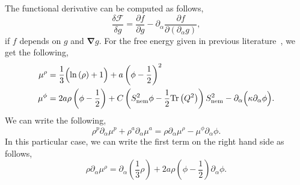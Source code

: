 \documentclass[fleqn,a4paper]{article} %
\numberwithin{equation}{section} %
\numberwithin{figure}{section} %
\numberwithin{algorithm}{section} %
\begin{document}
The functional derivative can be computed as follows,
\begin{equation}
    \frac{\delta \mathcal{F}}{\delta g} = \frac{\partial f}{\partial g} - \partial_\alpha \frac{\partial f}{\partial\left(\partial_\alpha g\right)},
\end{equation}
if $f$ depends on $g$ and $\bm{\nabla}g$. For the free energy given in previous literature~\cite{bhattacharyya_phase_2023}, we get the following,
\begin{equation}
\begin{split}
    \mu^\rho &= \frac{1}{3}\Bigl(\ln \left(\rho\right) + 1\Bigr) + a \left(\phi - \frac12\right)^2\\
    \mu^\phi &= 2 a \rho \left(\phi - \frac12\right) + C\left(S_\text{nem}^2 \phi - \frac12 \text{Tr}\left(Q^2\right)\right)S_\text{nem}^2 - \partial_\alpha\Bigl(\kappa \partial_\alpha \phi\Bigr).
\end{split}
\end{equation}
We can write the following,
\begin{equation}
    \rho^p\partial_\alpha \mu^p + \rho^a\partial_\alpha \mu^a = \rho \partial_\alpha \mu^\rho - \mu^\phi \partial_\alpha \phi.
\end{equation}
In this particular case, we can write the first term on the right hand side as follows,
\begin{equation}
    \rho \partial_\alpha \mu^\rho = \partial_\alpha \left(\frac13 \rho\right) + 2 a \rho \left(\phi - \frac12\right) \partial_\alpha \phi. 
\end{equation}

\clearpage %
\printbibliography{}
\end{document}
